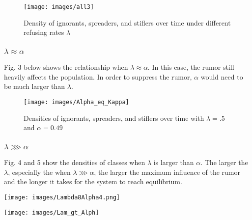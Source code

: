 \documentclass[11pt]{article}
\begin{document}
\begin{figure}[h!] 
\begin{center}
\texttt{[image: images/all3]}
\caption{Density of ignorants, spreaders, and stiflers over time under different refusing rates $\lambda$} \label{ffc}
\end{center}
\end{figure} 


\subsubsection{$\lambda \approx \alpha$}
Fig. 3 below shows the relationship when $\lambda \approx \alpha$. In this case, the rumor still heavily affects the population. In order to suppress the rumor, $\alpha$ would need to be much larger than $\lambda$. 
\begin{figure}[h!] 
\begin{center}
\texttt{[image: images/Alpha\_eq\_Kappa]}
\caption{Densities of ignorants, spreaders, and stiflers over time with $\lambda =.5$ and $\alpha = 0.49$} \label{ffc}
\end{center}
\end{figure} 



\subsubsection{$\lambda \ggg \alpha$}
Fig. 4 and 5 show the densities of classes when $\lambda$ is larger than $\alpha$. The larger the $\lambda$, especially the when $\lambda \ggg \alpha$, the larger the maximum influence of the rumor and the longer it takes for the system to reach equilibrium.  

\begin{minipage}{.5\textwidth}
\texttt{[image: images/Lambda8Alpha4.png]}
 \label{ffc}%
\end{minipage}%
\begin{minipage}{.5\textwidth}
\texttt{[image: images/Lam\_gt\_Alph]}
 \label{ffc}
\end{minipage}%
\end{document}
